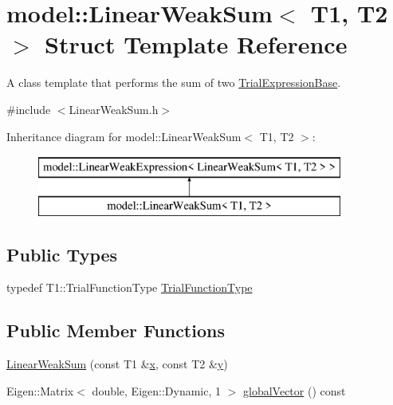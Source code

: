 \hypertarget{structmodel_1_1_linear_weak_sum}{}\section{model\+:\+:Linear\+Weak\+Sum$<$ T1, T2 $>$ Struct Template Reference}
\label{structmodel_1_1_linear_weak_sum}


A class template that performs the sum of two \hyperlink{structmodel_1_1_trial_expression_base}{Trial\+Expression\+Base}.  




{\ttfamily \#include $<$Linear\+Weak\+Sum.\+h$>$}

Inheritance diagram for model\+:\+:Linear\+Weak\+Sum$<$ T1, T2 $>$\+:\begin{figure}[H]
\begin{center}
\leavevmode
\includegraphics[height=2.000000cm]{structmodel_1_1_linear_weak_sum}
\end{center}
\end{figure}
\subsection*{Public Types}
\begin{DoxyCompactItemize}
\item 
typedef T1\+::\+Trial\+Function\+Type \hyperlink{structmodel_1_1_linear_weak_sum_a084f607c6baac6ac751f97b00c43b6d1}{Trial\+Function\+Type}
\end{DoxyCompactItemize}
\subsection*{Public Member Functions}
\begin{DoxyCompactItemize}
\item 
\hyperlink{structmodel_1_1_linear_weak_sum_af5818caddb6cc38844addf093143d102}{Linear\+Weak\+Sum} (const T1 \&\hyperlink{generate_s_t_lcyl_8m_a9336ebf25087d91c818ee6e9ec29f8c1}{x}, const T2 \&\hyperlink{generate_s_t_lcyl_8m_a2fb1c5cf58867b5bbc9a1b145a86f3a0}{y})
\item 
Eigen\+::\+Matrix$<$ double, Eigen\+::\+Dynamic, 1 $>$ \hyperlink{structmodel_1_1_linear_weak_sum_a9c5294435ef047c278aa4935593987ff}{global\+Vector} () const 
\end{DoxyCompactItemize}
